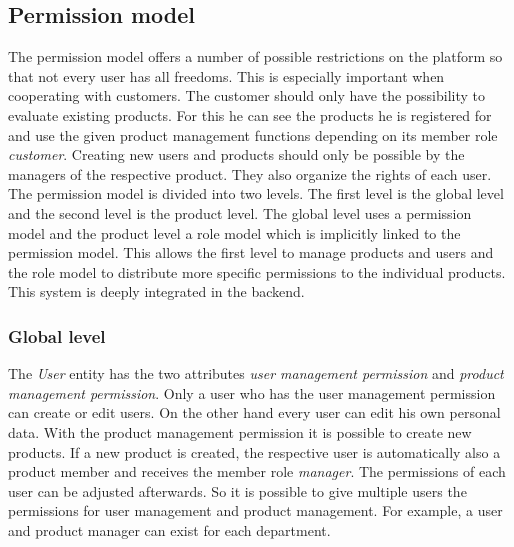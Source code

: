     \subsection*{Permission model}
    \label{subsec:permissionModel}
    The permission model offers a number of possible restrictions on the platform so that not every user has all freedoms. This is especially important when cooperating with customers. The customer should only have the possibility to evaluate existing products. For this he can see the products he is registered for and use the given product management functions depending on its member role \textit{customer}. Creating new users and products should only be possible by the managers of the respective product. They also organize the rights of each user. The permission model is divided into two levels. The first level is the global level and the second level is the product level. The global level uses a permission model and the product level a role model which is implicitly linked to the permission model. 
    This allows the first level to manage products and users and the role model to distribute more specific permissions to the individual products. This system is deeply integrated in the backend.

    \subsubsection*{Global level}
    The \textit{User} entity has the two attributes \textit{user management permission} and \textit{product management permission}. Only a user who has the user management permission can create or edit users. On the other hand every user can edit his own personal data. With the product management permission it is possible to create new products. If a new product is created, the respective user is automatically also a product member and receives the member role \textit{manager}. The permissions of each user can be adjusted afterwards. So it is possible to give multiple users the permissions for user management and product management. For example, a user and product manager can exist for each department. 

